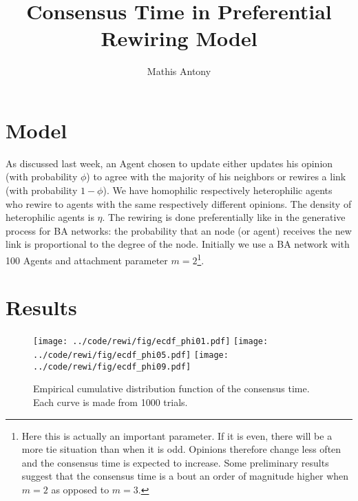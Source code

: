\documentclass[a4paper,12pt]{scrartcl}
\title{Consensus Time in Preferential Rewiring Model}
\author{Mathis Antony}
\newcommand{\figwidth}{0.49\linewidth}
\begin{document}
\maketitle
\section{Model}
As discussed last week, an Agent chosen to update either updates his opinion (with probability $\phi$) to agree with the majority of his neighbors or rewires a link (with probability $1-\phi$). We have homophilic respectively heterophilic agents who rewire to agents with the same respectively different opinions. The density of heterophilic agents is $\eta$. The rewiring is done preferentially like in the generative process for BA networks: the probability that an node (or agent) receives the new link is proportional to the degree of the node. Initially we use a BA network with 100 Agents and attachment parameter $m=2$\footnote{Here this is actually an important parameter. If it is even, there will be a more tie situation than when it is odd. Opinions therefore change less often and the consensus time is expected to increase. Some preliminary results suggest that the consensus time is a bout an order of magnitude higher when $m=2$ as opposed to $m=3$.}.

\section{Results}
\begin{figure}
\centering
\texttt{[image: ../code/rewi/fig/ecdf\_phi01.pdf]}
\texttt{[image: ../code/rewi/fig/ecdf\_phi05.pdf]}
\texttt{[image: ../code/rewi/fig/ecdf\_phi09.pdf]}
\caption{Empirical cumulative distribution function of the consensus time. Each curve is made from 1000 trials.}
\end{figure}




\end{document}
